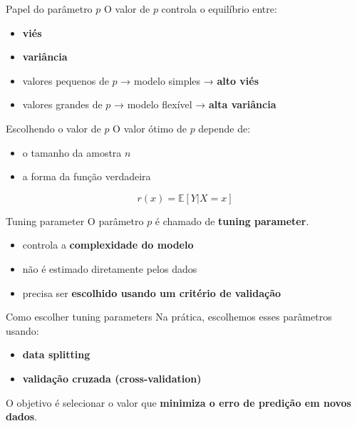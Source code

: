 \documentclass[
  ignorenonframetext,
  aspectratio=169,
]{beamer}
\providecommand{\tightlist}{%
  \setlength{\itemsep}{0pt}\setlength{\parskip}{0pt}}
\begin{document}
\begin{frame}
\begin{block}{Papel do parâmetro \(p\)}
\label{papel-do-paruxe2metro-p}
O valor de \(p\) controla o equilíbrio entre:

\begin{itemize}
\item
  \textbf{viés}
\item
  \textbf{variância}
\item
  valores pequenos de \(p\) → modelo simples → \textbf{alto viés}
\item
  valores grandes de \(p\) → modelo flexível → \textbf{alta variância}
\end{itemize}
\end{block}
\end{frame}

\begin{frame}
\begin{block}{Escolhendo o valor de \(p\)}
\label{escolhendo-o-valor-de-p}
O valor ótimo de \(p\) depende de:

\begin{itemize}
\tightlist
\item
  o tamanho da amostra \(n\)
\item
  a forma da função verdadeira
\end{itemize}

\[
r(x)=\mathbb{E}[Y|X=x]
\]
\end{block}

\begin{block}{Tuning parameter}
\label{tuning-parameter}
O parâmetro \(p\) é chamado de \textbf{tuning parameter}.

\begin{itemize}
\tightlist
\item
  controla a \textbf{complexidade do modelo}
\item
  não é estimado diretamente pelos dados
\item
  precisa ser \textbf{escolhido usando um critério de validação}
\end{itemize}
\end{block}
\end{frame}

\begin{frame}
\begin{block}{Como escolher tuning parameters}
\label{como-escolher-tuning-parameters}
Na prática, escolhemos esses parâmetros usando:

\begin{itemize}
\tightlist
\item
  \textbf{data splitting}
\item
  \textbf{validação cruzada (cross-validation)}
\end{itemize}

O objetivo é selecionar o valor que \textbf{minimiza o erro de predição
em novos dados}.
\end{block}
\end{frame}
\end{document}
